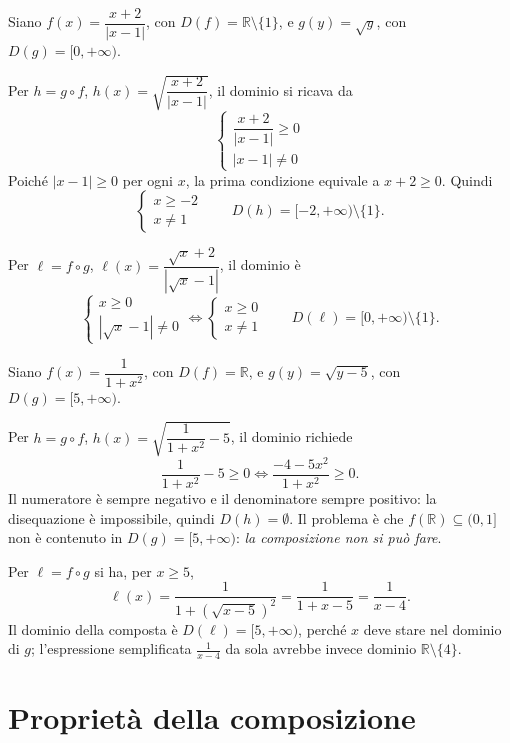 \documentclass[11pt,a4paper]{article}
\begin{document}
\begin{esempio}
Siano $f(x) = \dfrac{x + 2}{|x - 1|}$, con $D(f) = \mathbb{R} \setminus \{1\}$, e $g(y) = \sqrt{y}$, con $D(g) = [0, +\infty)$.

Per $h = g \circ f$, $h(x) = \sqrt{\dfrac{x+2}{|x-1|}}$, il dominio si ricava da
\[
\begin{cases} \dfrac{x+2}{|x-1|} \geq 0 \\[4pt] |x - 1| \neq 0 \end{cases}
\]
Poiché $|x-1| \geq 0$ per ogni $x$, la prima condizione equivale a $x + 2 \geq 0$. Quindi
\[
\begin{cases} x \geq -2 \\ x \neq 1 \end{cases}
\qquad D(h) = [-2, +\infty) \setminus \{1\}.
\]

Per $\ell = f \circ g$, $\ell(x) = \dfrac{\sqrt{x} + 2}{|\sqrt{x} - 1|}$, il dominio è
\[
\begin{cases} x \geq 0 \\ |\sqrt{x} - 1| \neq 0 \end{cases}
\iff
\begin{cases} x \geq 0 \\ x \neq 1 \end{cases}
\qquad D(\ell) = [0, +\infty) \setminus \{1\}.
\]
\end{esempio}

\begin{esempio}
Siano $f(x) = \dfrac{1}{1 + x^2}$, con $D(f) = \mathbb{R}$, e $g(y) = \sqrt{y - 5}$, con $D(g) = [5, +\infty)$.

Per $h = g \circ f$, $h(x) = \sqrt{\dfrac{1}{1+x^2} - 5}$, il dominio richiede
\[
\frac{1}{1+x^2} - 5 \geq 0 \iff \frac{-4 - 5x^2}{1 + x^2} \geq 0 .
\]
Il numeratore è sempre negativo e il denominatore sempre positivo: la disequazione è impossibile, quindi $D(h) = \emptyset$. Il problema è che $f(\mathbb{R}) \subseteq (0, 1]$ non è contenuto in $D(g) = [5, +\infty)$: \emph{la composizione non si può fare}.

Per $\ell = f \circ g$ si ha, per $x \geq 5$,
\[
\ell(x) = \frac{1}{1 + (\sqrt{x - 5})^2} = \frac{1}{1 + x - 5} = \frac{1}{x - 4}.
\]
Il dominio della composta è $D(\ell) = [5, +\infty)$, perché $x$ deve stare nel dominio di $g$; l'espressione semplificata $\frac{1}{x-4}$ da sola avrebbe invece dominio $\mathbb{R} \setminus \{4\}$.
\end{esempio}

\section{Proprietà della composizione}
\end{document}
